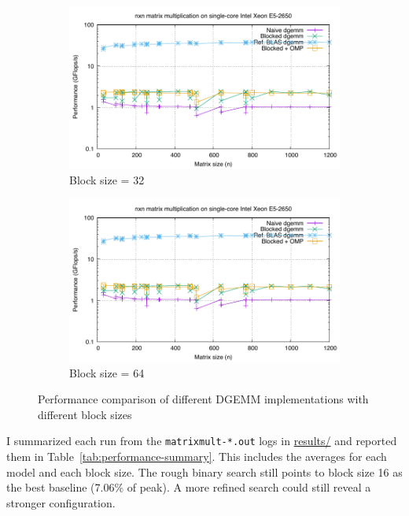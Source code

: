 \begin{figure}[H]
    \begin{subfigure}[b]{0.48\textwidth}
        \centering
        \includegraphics[width=\textwidth]{../src/3-Optimize-Matrix-Matrix-Mult/results/timing-32.pdf}
        \caption{Block size = 32}
        \label{fig:timing-32}
    \end{subfigure}
    \hfill
    \begin{subfigure}[b]{0.48\textwidth}
        \centering
        \includegraphics[width=\textwidth]{../src/3-Optimize-Matrix-Matrix-Mult/results/timing-64.pdf}
        \caption{Block size = 64}
        \label{fig:timing-64}
    \end{subfigure}
    
    \caption{Performance comparison of different DGEMM implementations with different block sizes}
    \label{fig:dgemm-performance}
\end{figure}

I summarized each run from the \texttt{matrixmult-*.out} logs in \href{./../src/3-Optimize-Matrix-Matrix-Mult/results}{results/} and reported them in Table~\ref{tab:performance-summary}. This includes the averages for each model and each block size. The rough binary search still points to block size 16 as the best baseline (7.06\% of peak). A more refined search could still reveal a stronger configuration.

